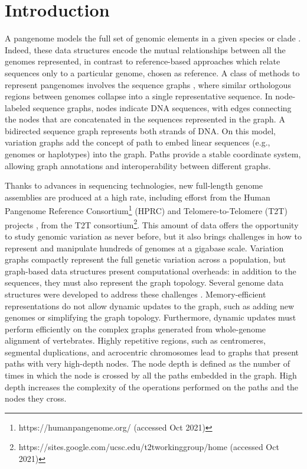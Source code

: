 \documentclass{bioinfo}
\begin{document}
\maketitle

\section{Introduction}

A pangenome models the full set of genomic elements in a given species or clade \citep{Eizenga_2020}. Indeed, these data structures encode the mutual relationships between all the genomes represented, in contrast to reference-based approaches which relate sequences only to a particular genome, chosen as reference. A class of methods to represent pangenomes involves the sequence graphs \citep{Paten:2017}, where similar orthologous regions between genomes collapse into a single representative sequence. In node-labeled sequence graphs, nodes indicate DNA sequences, with edges connecting the nodes that are concatenated in the sequences represented in the graph. A bidirected sequence graph represents both strands of DNA. On this model, variation graphs add the concept of path to embed linear sequences (e.g., genomes or haplotypes) into the graph. Paths provide a stable coordinate system, allowing graph annotations and interoperability between different graphs.

Thanks to advances in sequencing technologies, new full-length genome assemblies are produced at a high rate, including efforst from the Human Pangenome Reference Consortium\footnote{https://humanpangenome.org/ (accessed Oct 2021)} (HPRC) and Telomere-to-Telomere (T2T) projects \citep{Miga:2020, Logsdon_2021, Nurk_2021}, from the T2T consortium\footnote{https://sites.google.com/ucsc.edu/t2tworkinggroup/home (accessed Oct 2021)}. This amount of data offers the opportunity to study genomic variation as never before, but it also brings challenges in how to represent and manipulate hundreds of genomes at a gigabase scale. Variation graphs compactly represent the full genetic variation across a population, but graph-based data structures present computational overheads: in addition to the sequences, they must also represent the graph topology. Several genome data structures were developed to address these challenges \citep{Eizenga_2020_BX}. Memory-efficient representations do not allow dynamic updates to the graph, such as adding new genomes or simplifying the graph topology. Furthermore, dynamic updates must perform efficiently on the complex graphs generated from whole-genome alignment of vertebrates. Highly repetitive regions, such as centromeres, segmental duplications, and acrocentric chromosomes lead to graphs that present paths with very high-depth nodes. The node depth is defined as the number of times in which the node is crossed by all the paths embedded in the graph. High depth increases the complexity of the operations performed on the paths and the nodes they cross.
\end{document}

